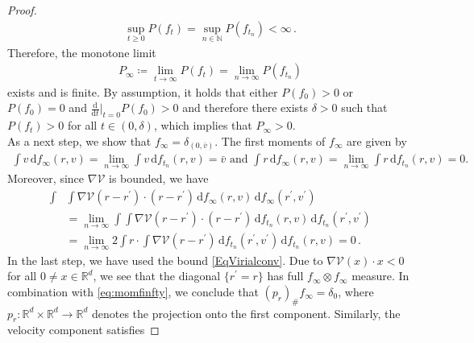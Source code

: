 \documentclass[11pt]{article}
\newcommand{\R}[0]{\mathbb R}
\newcommand{\N}[0]{\mathbb N}
\newcommand{\msolt}[2]{f_{#1}(#2)}
\newcommand{\Pfunc}{P}
\begin{document}
\begin{bibunit}[unsrtnat]
\begin{proof}
        \begin{align*}
            \sup\limits_{t\geq 0} \Pfunc (f_t) = \sup\limits_{n \in \N} \Pfunc (f_{t_n}) < \infty \, .
        \end{align*}
         Therefore, the monotone limit
        \begin{align*}
            \Pfunc_\infty \coloneq \lim\limits_{t \to \infty} \Pfunc (f_t) = \lim\limits_{n \to \infty} \Pfunc (f_{t_n})
        \end{align*}
        exists and is finite. By assumption, it holds that either $\Pfunc (f_0) > 0$ or $\Pfunc (f_0) = 0$ and $\frac{\mathrm{d}}{\mathrm{d}t} \Big|_{t = 0} \Pfunc (f_0) > 0$ and therefore there exists $\delta > 0$ such that $\Pfunc (f_t) > 0$ for all $t \in (0,\delta)$, which implies that $P_\infty > 0$. \\
        As a next step, we show that $f_\infty = \delta_{(0,\bar{v})} $. The first moments of $f_\infty$ are given by 
        \begin{align}
            \int v \, \mathrm{d}f_\infty(r,v) = \lim_{n \to \infty} \int v \, \mathrm{d}\msolt{t_n}{r,v} = \bar{v}  \text{ and } 
            \int r \, \mathrm{d}f_\infty(r,v) =\lim_{n \to \infty} \int r \, \mathrm{d}\msolt{t_n}{r,v} = 0  . \label{eq:momfinfty}
        \end{align}
        Moreover, since $\nabla \mathcal{V}$ is bounded, we have 
        \begin{align}
            \int &\int \nabla \mathcal{V}(r-r^\prime) \cdot (r-r^\prime) \, \mathrm{d}f_\infty (r,v) \, \mathrm{d}f_\infty(r^\prime, v^\prime) \nonumber \\
            &= \lim\limits_{n \to \infty} \int \int \nabla \mathcal{V}(r-r^\prime) \cdot (r-r^\prime) \, \mathrm{d}\msolt{t_n}{r,v} \, \mathrm{d}\msolt{t_n}{r^\prime, v^\prime} \nonumber \\
            &= \lim\limits_{n \to \infty} 2 \int r \cdot \int \nabla \mathcal{V}(r-r^\prime) \, \mathrm{d}\msolt{t_n}{r^\prime, v^\prime} \, \mathrm{d}\msolt{t_n}{r,v} = 0 \, . \label{eq:momentlimit}
        \end{align}
        In the last step, we have used the bound \eqref{EqVirialconv}. Due to $\nabla \mathcal{V}(x) \cdot x < 0$ for all $0 \neq x \in \R^d$, we see that the diagonal $\{ r^\prime = r \} $ has full $f_\infty \otimes f_\infty$ measure. In combination with \eqref{eq:momfinfty}, we conclude that $(p_r)_{\#} f_\infty = \delta_{0}$, where $p_r \colon \R^d \times \R^d \to \R^d $ denotes the projection onto the first component. Similarly, the velocity component satisfies

\end{proof}
\end{bibunit}
\end{document}
